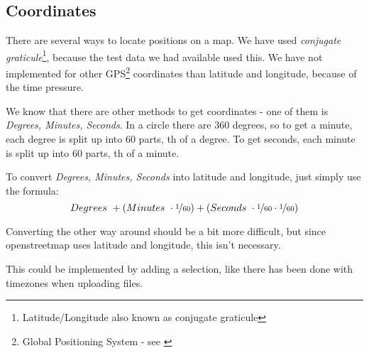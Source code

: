 \subsection{Coordinates}
\label{sec:coordinates}
There are several ways to locate positions on a map. We have used \emph{conjugate graticule}\footnote{Latitude/Longitude also known as conjugate graticule}, because the test data we had available used this. We have not implemented for other GPS\footnote{Global Positioning System - see \cite{GPS}} coordinates than latitude and longitude, because of the time pressure.

We know that there are other methods to get coordinates - one of them is \emph{Degrees, Minutes, Seconds}. In a circle there are 360 degrees, so to get a minute, each degree is split up into 60 parts, th of a degree. To get seconds, each minute is split up into 60 parts, th of a minute.

To convert \emph{Degrees, Minutes, Seconds} into latitude and longitude, just simply use the formula:
\begin{equation}
Degrees~ + \left(Minutes~ \cdot \nicefrac{1}{60}\right) + \left(Seconds~ \cdot \nicefrac{1}{60} \cdot \nicefrac{1}{60}\right)
\end{equation}

Converting the other way around should be a bit more difficult, but since openstreetmap uses latitude and longitude, this isn't necessary.

This could be implemented by adding a selection, like there has been done with timezones when uploading files.